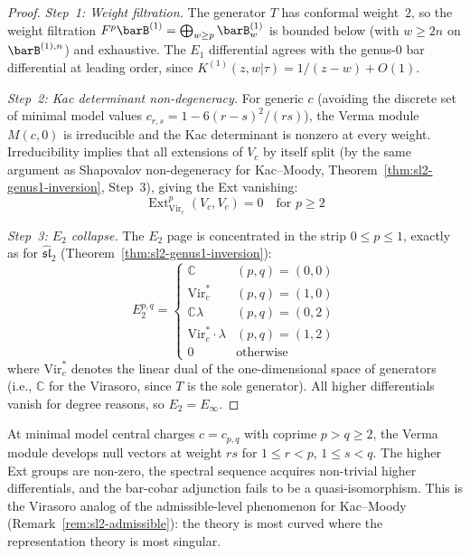 \begin{proof}
\emph{Step~1: Weight filtration.}
The generator $T$ has conformal weight~$2$, so the weight filtration
$F^p\barB^{(1)} = \bigoplus_{w \geq p} \barB^{(1)}_w$ is bounded below
(with $w \geq 2n$ on $\barB^{(1),n}$) and exhaustive.  The $E_1$
differential agrees with the genus-0 bar differential at leading
order, since
$K^{(1)}(z,w|\tau) = 1/(z-w) + O(1)$.

\emph{Step~2: Kac determinant non-degeneracy.}
For generic $c$ (avoiding the discrete set of minimal model values
$c_{r,s} = 1 - 6(r-s)^2/(rs)$), the Verma module $M(c,0)$ is
irreducible and the Kac determinant is nonzero at every weight.
Irreducibility implies that all extensions of $V_c$ by itself split
(by the same argument as Shapovalov non-degeneracy for Kac--Moody,
Theorem~\ref{thm:sl2-genus1-inversion}, Step~3), giving the
Ext vanishing:
\begin{equation}
\operatorname{Ext}^p_{\mathrm{Vir}_c}(V_c, V_c) = 0 \quad \text{for } p \geq 2
\end{equation}

\emph{Step~3: $E_2$ collapse.}
The $E_2$ page is concentrated in the strip $0 \leq p \leq 1$,
exactly as for $\widehat{\mathfrak{sl}}_2$
(Theorem~\ref{thm:sl2-genus1-inversion}):
\begin{equation}
E_2^{p,q} = \begin{cases}
\mathbb{C} & (p,q) = (0,0) \\
\mathrm{Vir}_c^* & (p,q) = (1,0) \\
\mathbb{C}\lambda & (p,q) = (0,2) \\
\mathrm{Vir}_c^* \cdot \lambda & (p,q) = (1,2) \\
0 & \text{otherwise}
\end{cases}
\end{equation}
where $\mathrm{Vir}_c^*$ denotes the linear dual of the
one-dimensional space of generators (i.e., $\mathbb{C}$ for the
Virasoro, since $T$ is the sole generator).  All higher differentials
vanish for degree reasons, so $E_2 = E_\infty$.
\end{proof}

\begin{remark}\label{rem:vir-minimal-model}
At minimal model central charges $c = c_{p,q}$ with coprime $p > q \geq 2$,
the Verma module develops null vectors at weight $rs$ for $1 \leq r < p$,
$1 \leq s < q$.  The higher Ext groups are non-zero, the spectral
sequence acquires non-trivial higher differentials, and the bar-cobar
adjunction fails to be a quasi-isomorphism.  This is the Virasoro
analog of the admissible-level phenomenon for Kac--Moody
(Remark~\ref{rem:sl2-admissible}): the theory is most curved where
the representation theory is most singular.
\end{remark}

